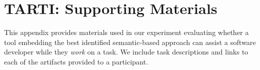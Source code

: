 \chapter{TARTI: Supporting Materials}

This appendix provides materials used in our experiment evaluating whether a tool embedding the best identified  semantic-based approach can assist a software developer while they \textit{work} on a task.
We include task descriptions and links to each of the artifacts provided to a participant.


